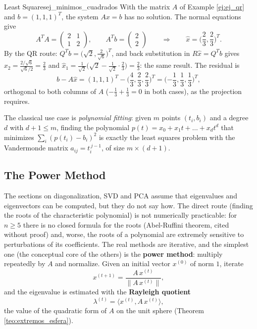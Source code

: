 \documentclass[11pt, a4paper]{article}
\begin{document}
\begin{ejemplo}{Least Squares}{ej_minimos_cuadrados}
With the matrix $A$ of Example \ref{ej:ej_qr} and $b = (1, 1, 1)^T$, the system $Ax = b$ has no solution. The normal equations give
\[
A^T A = \begin{pmatrix} 2 & 1 \\ 1 & 2 \end{pmatrix}, \qquad A^T b = \begin{pmatrix} 2 \\ 2 \end{pmatrix}
\qquad \Longrightarrow \qquad \hat{x} = \Big( \frac{2}{3}, \frac{2}{3} \Big)^T.
\]
By the QR route: $Q^T b = \big( \sqrt{2}, \frac{2}{\sqrt{6}} \big)^T$, and back substitution in $R \hat{x} = Q^T b$ gives $\hat{x}_2 = \frac{2/\sqrt{6}}{\sqrt{6}/2} = \frac{2}{3}$ and $\hat{x}_1 = \frac{1}{\sqrt{2}} \big( \sqrt{2} - \frac{1}{\sqrt{2}} \cdot \frac{2}{3} \big) = \frac{2}{3}$: the same result. The residual is
\[
b - A\hat{x} = (1,1,1)^T - \Big( \frac{4}{3}, \frac{2}{3}, \frac{2}{3} \Big)^T = \Big( {-\frac{1}{3}}, \frac{1}{3}, \frac{1}{3} \Big)^T,
\]
orthogonal to both columns of $A$ ($-\frac{1}{3} + \frac{1}{3} = 0$ in both cases), as the projection requires.
\end{ejemplo}

\obs The classical use case is \emph{polynomial fitting}: given $m$ points $(t_i, b_i)$ and a degree $d$ with $d + 1 \le m$, finding the polynomial $p(t) = x_0 + x_1 t + \dots + x_d t^d$ that minimizes $\sum_i (p(t_i) - b_i)^2$ is exactly the least squares problem with the Vandermonde matrix $a_{ij} = t_i^{\, j-1}$, of size $m \times (d+1)$.

\subsection{The Power Method}

The sections on diagonalization, SVD and PCA assume that eigenvalues and eigenvectors can be computed, but they do not say how. The direct route (finding the roots of the characteristic polynomial) is not numerically practicable: for $n \ge 5$ there is no closed formula for the roots (Abel-Ruffini theorem, cited without proof) and, worse, the roots of a polynomial are extremely sensitive to perturbations of its coefficients. The real methods are iterative, and the simplest one (the conceptual core of the others) is the \textbf{power method}: multiply repeatedly by $A$ and normalize. Given an initial vector $x^{(0)}$ of norm $1$, iterate
\[
x^{(t+1)} = \frac{A \, x^{(t)}}{\| A \, x^{(t)} \|},
\]
and the eigenvalue is estimated with the \textbf{Rayleigh quotient}
\[
\lambda^{(t)} = \langle x^{(t)}, A \, x^{(t)} \rangle,
\]
the value of the quadratic form of $A$ on the unit sphere (Theorem \ref{teo:extremos_esfera}).
\end{document}
